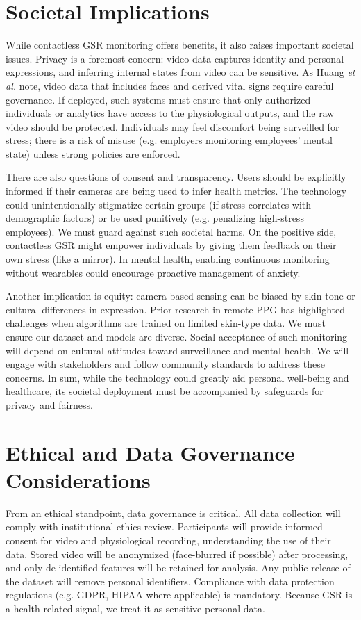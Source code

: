 \documentclass[12pt]{article}
\begin{document}
    \section{Societal Implications}
    While contactless GSR monitoring offers benefits, it also raises important societal issues. Privacy is a foremost concern: video data captures identity and personal expressions, and inferring internal states from video can be sensitive. As Huang \emph{et al.} note, video data that includes faces and derived vital signs require careful governance. If deployed, such systems must ensure that only authorized individuals or analytics have access to the physiological outputs, and the raw video should be protected. Individuals may feel discomfort being surveilled for stress; there is a risk of misuse (e.g. employers monitoring employees' mental state) unless strong policies are enforced.

    There are also questions of consent and transparency. Users should be explicitly informed if their cameras are being used to infer health metrics. The technology could unintentionally stigmatize certain groups (if stress correlates with demographic factors) or be used punitively (e.g. penalizing high-stress employees). We must guard against such societal harms. On the positive side, contactless GSR might empower individuals by giving them feedback on their own stress (like a mirror). In mental health, enabling continuous monitoring without wearables could encourage proactive management of anxiety.

    Another implication is equity: camera-based sensing can be biased by skin tone or cultural differences in expression. Prior research in remote PPG has highlighted challenges when algorithms are trained on limited skin-type data. We must ensure our dataset and models are diverse. Social acceptance of such monitoring will depend on cultural attitudes toward surveillance and mental health. We will engage with stakeholders and follow community standards to address these concerns. In sum, while the technology could greatly aid personal well-being and healthcare, its societal deployment must be accompanied by safeguards for privacy and fairness.


    \section{Ethical and Data Governance Considerations}
    From an ethical standpoint, data governance is critical. All data collection will comply with institutional ethics review. Participants will provide informed consent for video and physiological recording, understanding the use of their data. Stored video will be anonymized (face-blurred if possible) after processing, and only de-identified features will be retained for analysis. Any public release of the dataset will remove personal identifiers. Compliance with data protection regulations (e.g. GDPR, HIPAA where applicable) is mandatory. Because GSR is a health-related signal, we treat it as sensitive personal data.
\end{document}
